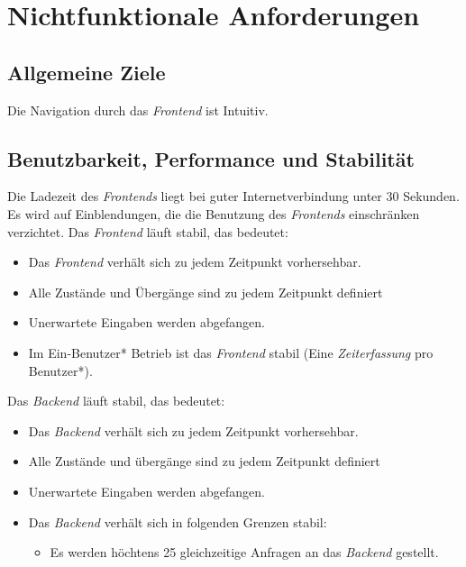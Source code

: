 \section{Nichtfunktionale Anforderungen}

\subsection{Allgemeine Ziele}
\begin{requirements}
     Die Navigation durch das \emph{Frontend} ist Intuitiv.
\end{requirements}

\subsection{Benutzbarkeit, Performance und Stabilität}
\begin{requirements}
     Die Ladezeit des \emph{Frontends} liegt bei guter Internetverbindung unter 30 Sekunden.
     Es wird auf Einblendungen, die die Benutzung des \emph{Frontends} einschränken verzichtet.
     Das \emph{Frontend} läuft stabil, das bedeutet:
     \begin{itemize}
        \item Das \emph{Frontend} verhält sich zu jedem Zeitpunkt vorhersehbar.
        \item Alle Zustände und Übergänge sind zu jedem Zeitpunkt definiert
        \item Unerwartete Eingaben werden abgefangen.
        \item Im Ein-Benutzer* Betrieb ist das \emph{Frontend} stabil (Eine \emph{Zeiterfassung} pro Benutzer*).
     \end{itemize}
      Das \emph{Backend} läuft stabil, das bedeutet:
          \begin{itemize}
             \item Das \emph{Backend} verhält sich zu jedem Zeitpunkt vorhersehbar.
             \item Alle Zustände und übergänge sind zu jedem Zeitpunkt definiert
             \item Unerwartete Eingaben werden abgefangen.
             \item Das \emph{Backend} verhält sich in folgenden Grenzen stabil:
             \begin{itemize}
                 \item Es werden höchtens 25 gleichzeitige Anfragen an das \emph{Backend} gestellt.
             \end{itemize}
          \end{itemize}
\end{requirements}

